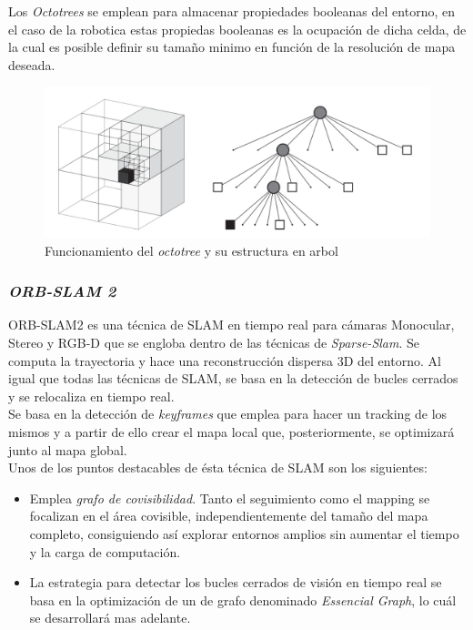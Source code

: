 Los \textit{Octotrees} se emplean para almacenar propiedades booleanas del entorno, en el caso de
la robotica estas propiedas booleanas es la ocupación de dicha celda, de la cual es posible definir su tamaño minimo en función de la resolución de mapa
deseada.
\begin{figure}[h!]
    \centering
    \includegraphics[width=.7\textwidth]{images/octotree}
    \caption{Funcionamiento del \textit{octotree} y su estructura en arbol}
\end{figure}

\newpage
\subsubsection{\textit{ORB-SLAM 2}}
ORB-SLAM2 es una técnica de SLAM en tiempo real para cámaras Monocular, Stereo y RGB-D que se engloba dentro de las técnicas de 
\textit{Sparse-Slam}. Se computa la trayectoria y hace una reconstrucción dispersa 3D del entorno. Al igual que todas las técnicas 
de SLAM, se basa en la detección de bucles cerrados y  se relocaliza en tiempo real. \\
Se basa en la detección de \textit{keyframes} que emplea para hacer un tracking de los mismos y a partir de ello crear el 
mapa local que, posteriormente, se optimizará junto al mapa global. \\
Unos de los puntos destacables de ésta técnica de SLAM son los siguientes:
\begin{itemize}
    \item Emplea \textit{grafo de covisibilidad}. Tanto el seguimiento como el mapping se focalizan en el área covisible,
    independientemente del tamaño del mapa completo, consiguiendo así explorar entornos amplios sin
    aumentar el tiempo y la carga de computación.

    \item La estrategia para detectar los bucles cerrados de visión en tiempo real se basa en la optimización de
   un de grafo denominado \textit{Essencial Graph}, lo cuál se desarrollará mas adelante.
\end{itemize}

